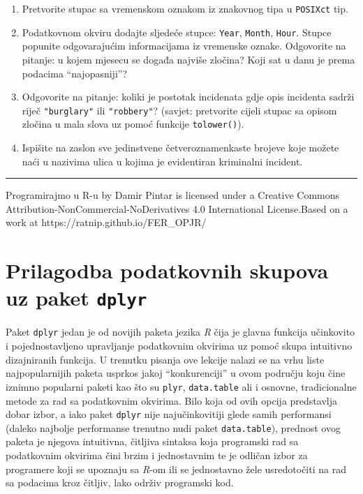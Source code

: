 \documentclass[]{book}
\theoremstyle{definition}
\theoremstyle{definition}
\theoremstyle{definition}
\theoremstyle{remark}
\begin{document}
\begin{enumerate}
\def\labelenumi{\arabic{enumi}.}
\item
  Pretvorite stupac sa vremenskom oznakom iz znakovnog tipa u
  \texttt{POSIXct} tip.
\item
  Podatkovnom okviru dodajte sljedeće stupce: \texttt{Year},
  \texttt{Month}, \texttt{Hour}. Stupce popunite odgovarajućim
  informacijama iz vremenske oznake. Odgovorite na pitanje: u kojem
  mjesecu se događa najviše zločina? Koji sat u danu je prema podacima
  ``najopasniji''?
\item
  Odgovorite na pitanje: koliki je postotak incidenata gdje opis
  incidenta sadrži riječ \texttt{"burglary"} ili \texttt{"robbery"}?
  (savjet: pretvorite cijeli stupac sa opisom zločina u mala slova uz
  pomoć funkcije \texttt{tolower()}).
\item
  Ispišite na zaslon sve jedinstvene četveroznamenkaste brojeve koje
  možete naći u nazivima ulica u kojima je evidentiran kriminalni
  incident.
\end{enumerate}

\begin{center}\rule{0.5\linewidth}{\linethickness}\end{center}

{Programirajmo u R-u} by Damir Pintar is licensed under a Creative
Commons Attribution-NonCommercial-NoDerivatives 4.0 International
License.Based on a work at https://ratnip.github.io/FER\_OPJR/

\chapter{\texorpdfstring{Prilagodba podatkovnih skupova uz paket
\texttt{dplyr}}{Prilagodba podatkovnih skupova uz paket dplyr}}\label{prilagodba-podatkovnih-skupova-uz-paket-dplyr}

Paket \texttt{dplyr} jedan je od novijih paketa jezika \emph{R} čija je
glavna funkcija učinkovito i pojednostavljeno upravljanje podatkovnim
okvirima uz pomoć skupa intuitivno dizajniranih funkcija. U trenutku
pisanja ove lekcije nalazi se na vrhu liste najpopularnijih paketa
usprkos jakoj ``konkurenciji'' u ovom području koju čine iznimno
popularni paketi kao što su \texttt{plyr}, \texttt{data.table} ali i
osnovne, tradicionalne metode za rad sa podatkovnim okvirima. Bilo koja
od ovih opcija predstavlja dobar izbor, a iako paket \texttt{dplyr} nije
najučinkovitiji glede samih performansi (daleko najbolje performanse
trenutno nudi paket \texttt{data.table}), prednost ovog paketa je
njegova intuitivna, čitljiva sintaksa koja programski rad sa podatkovnim
okvirima čini brzim i jednostavnim te je odličan izbor za programere
koji se upoznaju sa \emph{R}-om ili se jednostavno žele usredotočiti na
rad sa podacima kroz čitljiv, lako održiv programski kod.
\end{document}
